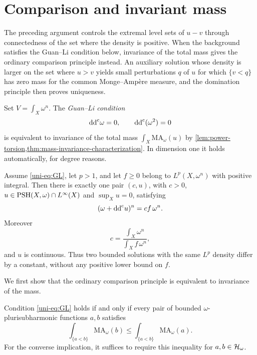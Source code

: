 \section{Comparison and invariant mass}
\label{uni-sec:bounded}

The preceding argument controls the extremal level sets of $u-v$ through connectedness of the set where the density is positive. When the background satisfies the Guan--Li condition below, invariance of the total mass gives the ordinary comparison principle instead. An auxiliary solution whose density is larger on the set where $u>v$ yields small perturbations $q$ of $u$ for which $\{v<q\}$ has zero mass for the common Monge--Amp\`ere measure, and the domination principle then proves uniqueness.

Set $V=\int_X\omega^n$. The \emph{Guan--Li condition}
\begin{equation}
   \mathrm{dd}^{\mathrm{c}}\omega=0,\qquad \mathrm{dd}^{\mathrm{c}}(\omega^2)=0
   \label{uni-eq:GL}
\end{equation}
is equivalent to invariance of the total mass $\int_X\mathrm{MA}_\omega(u)$ by \cref{lem:power-torsion,thm:mass-invariance-characterization}. In dimension one it holds automatically, for degree reasons.

\begin{theorem}\label{uni-thm:GL-intro}
Assume \eqref{uni-eq:GL}, let $p>1$, and let $f\geq0$ belong to
$L^p(X,\omega^n)$ with positive integral. Then there is exactly one
pair $(c,u)$, with $c>0$, $u\in\mathrm{PSH}(X,\omega)\cap L^\infty(X)$ and
$\sup_Xu=0$, satisfying
\[
  (\omega+\mathrm{dd}^{\mathrm{c}} u)^n=c f\,\omega^n.
\]
Moreover
\[
   c=\frac{\int_X\omega^n}{\int_Xf\,\omega^n},
\]
and $u$ is continuous.  Thus two bounded solutions with the same
$L^p$ density differ by a constant, without any positive lower bound on $f$.
\end{theorem}

We first show that the ordinary comparison principle is equivalent to invariance of the mass.

\begin{theorem}\label{uni-thm:GL-equivalence}
Condition \eqref{uni-eq:GL} holds if and only if every pair of bounded $\omega$-plurisubharmonic functions $a,b$ satisfies
\begin{equation}\label{uni-eq:ordinaryCP}
 \int_{\{a<b\}}\mathrm{MA}_\omega(b)
 \leq\int_{\{a<b\}}\mathrm{MA}_\omega(a).
\end{equation}
For the converse implication, it suffices to require this inequality for $a,b\in\mathcal H_\omega$.
\end{theorem}

